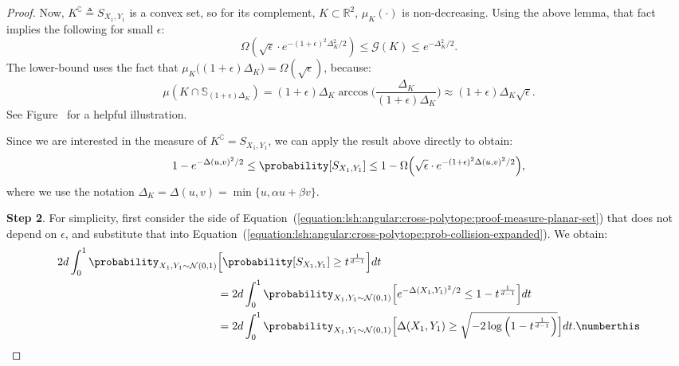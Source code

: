 \begin{proof}
    Now, $K^\complement \triangleq S_{X_1, Y_1}$ is a convex set, so for its complement,
    $K \subset \mathbb{R}^2$, $\mu_K(\cdot)$ is non-decreasing.
    Using the above lemma, that fact implies the following for small $\epsilon$:
    \begin{equation*}
        \Omega(\sqrt{\epsilon} \cdot e^{-(1+\epsilon)^2\Delta^2_K/2}) \leq \mathcal{G}(K) \leq e^{-\Delta_K^2/2}.
    \end{equation*}
    The lower-bound uses the fact that $\mu_K \Big( (1 + \epsilon) \Delta_K \Big) = \Omega (\sqrt{\epsilon})$,
    because:
    \begin{equation}
        \label{equation:lsh:angular:cross-polytope:proof-lower-bound}
        \mu(K \cap \mathbb{S}_{(1+\epsilon)\Delta_K}) = (1 + \epsilon) \Delta_K \arccos \Big(
            \frac{\Delta_K}{(1 + \epsilon) \Delta_K} \Big) \approx (1 + \epsilon) \Delta_K \sqrt{\epsilon}.
    \end{equation}
    See Figure~ for a helpful illustration.

    Since we are interested in the measure of $K^\complement = S_{X_1, Y_1}$, we can apply
    the result above directly to obtain:
    \begin{equation}
        \label{equation:lsh:angular:cross-polytope:proof-measure-planar-set}
        1 - e^{-\Delta(u, v)^2/2} \leq \probability [S_{X_1, Y_1}] \leq
        1 - \Omega\Big( \sqrt{\epsilon} \cdot e^{-(1+\epsilon)^2\Delta(u, v)^2/2} \Big),
    \end{equation}
    where we use the notation $\Delta_{K} = \Delta(u, v) = \min \{ u, \alpha u + \beta v \}$.

    \textbf{Step 2}. For simplicity, first consider the side of Equation~(\ref{equation:lsh:angular:cross-polytope:proof-measure-planar-set})
    that does not depend on $\epsilon$,
    and substitute that into Equation~(\ref{equation:lsh:angular:cross-polytope:prob-collision-expanded}).
    We obtain:
    \begin{align*}
        2d \int_0^1 \probability_{X_1, Y_1 \sim \mathcal{N}(0, 1)} &\Big[ \probability [ S_{X_1, Y_1} ] \geq t^{\frac{1}{d - 1}} \Big] dt \\
        &=
        2d \int_0^1 \probability_{X_1, Y_1 \sim \mathcal{N}(0, 1)} \Big[ e^{-\Delta(X_1, Y_1)^2/2} \leq 1 - t^{\frac{1}{d - 1}}  \Big] dt \\
        &= 2d \int_0^1 \probability_{X_1, Y_1 \sim \mathcal{N}(0, 1)} \Big[ \Delta(X_1, Y_1) \geq \sqrt{-2 \log \Big( 1 - t^{\frac{1}{d - 1}} \Big)}  \Big] dt. \numberthis \label{equation:lsh:angular:cross-polytope:prob-collision-noepsilon-substitute}
    \end{align*}


\end{proof}
